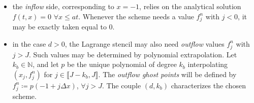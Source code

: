 \documentclass{article}
\numberwithin{equation}{section}
\newcommand{\N}{\mathbb{N}}
\begin{document}
\begin{itemize}
\item the \emph{inflow} side, corresponding to $x=-1$, relies on the analytical solution $f(t,x) = 0$ $\forall x \leqslant a t$. Whenever the scheme needs a value $f^n_j$ with $j < 0$, it may be exactly taken equal to 0.
\item in the case $d>0$, the Lagrange stencil may also need \emph{outflow} values $f^n_{j}$ with $j>J$. Such values may be determined by polynomial extrapolation. Let $k_b \in \N$, and let $p$ be the unique polynomial of degree $k_b$ interpolating $(x_j, f^n_j)$ for $j\in \llbracket J-k_b,J\rrbracket$. The \emph{outflow ghost points} will be defined by $f^n_j \coloneqq p(-1 + j \Delta x)$, $\forall j > J$. The couple $(d,k_b)$ characterizes the chosen scheme. 
\end{itemize}
\end{document}
